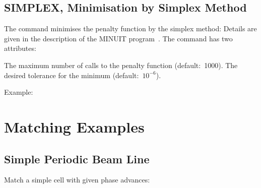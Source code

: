 \subsection{SIMPLEX, Minimisation by Simplex Method}
The  command minimises the penalty
function by the simplex method:
Details are given in the description of the MINUIT program~\cite{B-JAM71}.
The command has two attributes:
\begin{mylist}
The maximum number of calls to the penalty function (default:~1000).
The desired tolerance for the minimum (default:~\(10^{-6}\)).
\end{mylist}
Example:
 
\section{Matching Examples}
\label{S-MATEX}

\subsection{Simple Periodic Beam Line}
Match a simple cell with given phase advances:
